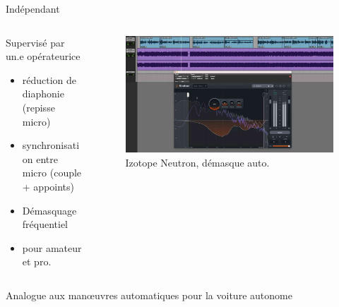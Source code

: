 \documentclass[9pt, aspectratio=169]{beamer}
\begin{document}
\begin{frame}{Indépendant} %
\begin{columns}

    \begin{column}{0.48\textwidth}
	    Supervisé par un.e opérateurice
		\begin{itemize}
			\item réduction de diaphonie (repisse micro)
			\item synchronisation entre micro (couple + appoints)
			\item Démasquage fréquentiel \cite{wichern_comparison_2015}
			\item pour amateur et pro.
		\end{itemize}
    \end{column}
    \begin{column}{0.48\textwidth}
		\begin{figure}
			\includegraphics[width=\textwidth]{fig/neutron_unmask.jpg}
			\caption{Izotope Neutron, démasque auto.}
		\end{figure}
    \end{column}
\end{columns}
Analogue aux manœuvres automatiques pour la voiture autonome
\end{frame}
\end{document}
